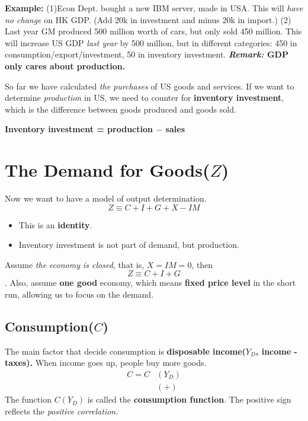\documentclass[11pt, a4paper]{ECON2123}
\begin{document}
\begin{spacing}{1.5}
    {\bf Example:} (1)Econ Dept. bought a new IBM server, made in USA. 
    This will {\it have no change} on HK GDP.
    (Add 20k in investment and minus 20k in import.)
    (2) Last year GM produced 500 million worth of cars, but only sold 
    450 million. This will increase US GDP {\it last year} by 500 million,
    but in different categories: 450 in consumption/export/investment, 
    50 in inventory investment.
    \textbf{\textit{Remark:} GDP only cares about production.}

    So far we have calculated {\it the purchases} of US goods 
    and services. If we want to determine {\it production} in US,
    we need to counter for {\bf inventory investment}, which 
    is the difference between goods produced and goods sold.
    \begin{center}
        {\bf Inventory investment = production $-$ sales}
    \end{center}

    \section{The Demand for Goods($Z$)}

    Now we want to have a model of output determination.
    $$Z\equiv C+I+G+X-IM$$
    \begin{itemize}
        \item This is an {\bf identity}.
        \item Inventory investment is not part of demand, but production.
    \end{itemize}

    Assume {\it the economy is closed}, that is, $X=IM=0$, then
    $$Z\equiv C+I+G$$.
    Also, assume {\bf one good} economy, which means 
    {\bf fixed price level} in the short run, allowing us 
    to focus on the demand.

    \subsection{Consumption($C$)}

    The main factor that decide consumption is 
    {\bf disposable income($Y_D$, income - taxes).} When income goes up,
    people buy more goods.
    \begin{align*}
        C=C&(Y_D)\\
        &(+)
    \end{align*}
    The function $C(Y_D)$ is called the {\bf consumption function}.
    The positive sign reflects the {\it positive correlation.}


\end{spacing}
\end{document}
